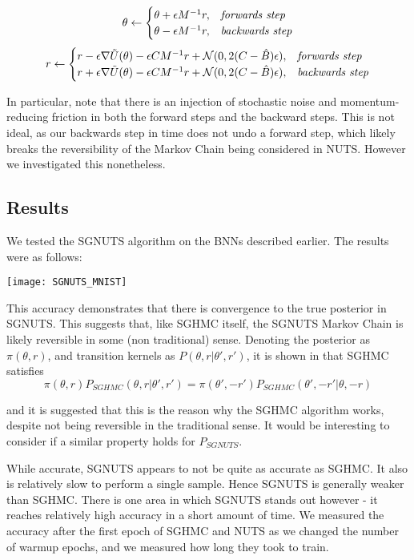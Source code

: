 $$
    \theta \leftarrow 
    \begin{cases}\theta + \epsilon M^{-1}r, & \text{{\textit{forwards step}}}\\
                \theta - \epsilon M^{-1}r,  & \text{{\textit{backwards step}}}

\end{cases}
$$
$$
    r \leftarrow 
    \begin{cases}
                
    r - \epsilon \nabla \tilde{U}(\theta) - \epsilon C M^{-1}r + \mathcal{N}(0,2(C-\hat{B})\epsilon), & \text{{\textit{forwards step}}}\\
   
    r + \epsilon \nabla \tilde{U}(\theta) - \epsilon C M^{-1}r + \mathcal{N}(0,2(C-\hat{B})\epsilon), & \text{{\textit{backwards step}}}\\
 \end{cases}
    $$

In particular, note that there is an injection of stochastic noise and momentum-reducing friction in both the forward steps and the backward steps. This is not ideal, as our backwards step in time does not undo a forward step, which likely breaks the reversibility of the Markov Chain being considered in NUTS. However we investigated this nonetheless.

\subsection{Results} 

We tested the SGNUTS algorithm on the BNNs described earlier. The results were as follows:

\texttt{[image: SGNUTS\_MNIST]}

This accuracy demonstrates that there is convergence to the true posterior in SGNUTS. This suggests that, like SGHMC itself, the SGNUTS Markov Chain is likely reversible in some (non traditional) sense. Denoting the posterior as $\pi(\theta, r)$, and transition kernels as $P(\theta, r| \theta', r')$, it is shown in \cite{} that SGHMC satisfies
$$ \pi(\theta,r)P_{SGHMC}(\theta,r|\theta',r') = \pi(\theta',-r')P_{SGHMC}(\theta',-r'|\theta,-r)$$

and it is suggested that this is the reason why the SGHMC algorithm works, despite not being reversible in the traditional sense. It would be interesting to consider if a similar property holds for $P_{SGNUTS}$.

While accurate, SGNUTS appears to not be quite as accurate as SGHMC. It also is relatively slow to perform a single sample. Hence SGNUTS is generally weaker than SGHMC. There is one area in which SGNUTS stands out however - it reaches relatively high accuracy in a short amount of time. We measured the accuracy after the first epoch of SGHMC and NUTS as we changed the number of warmup epochs, and we measured how long they took to train.

